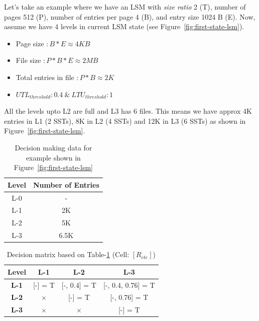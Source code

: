 Let's take an example where we have an LSM with \textit{size ratio} 2 (T), number of pages 512 (P), 
number of entries per page 4 (B), and entry size 1024 B (E). Now, assume we have 4 levels in current LSM state 
(see Figure~\ref{fig:first-state-lsm}).

\begin{itemize}
    \item Page size $\colon B * E \approx 4 KB$
    \item File size $\colon P * B * E \approx 2 MB$
    \item Total entries in file $\colon P * B \approx 2 K$
    \item $UTL_{threshold} \colon 0.4\ \&\ LTU_{threshold} \colon 1$ 
\end{itemize}

All the levels upto L2 are full and L3 has 6 files. This means we have approx 4K entries in L1 (2 SSTs), 8K in 
L2 (4 SSTs) and 12K in L3 (6 SSTs) as shown in Figure~\ref{fig:first-state-lsm}.

\begin{table}
    \begin{tabular}{|c|c|}
        \hline
        \textbf{Level} & \textbf{Number of Entries} \\
        \hline
        L-0 & \-- \\
        \hline
        L-1 & 2K \\
        \hline
        L-2 & 5K \\
        \hline
        L-3 & 6.5K \\
        \hline
    \end{tabular}
    \caption{Decision making data for example shown in Figure~\ref{fig:first-state-lsm}}
    \label{table:ex-decision-making-meta-data}
\end{table}

\begin{table}
    \begin{tabular}{ |c|c|c|c| }
        \hline
        \textbf{Level} & \textbf{L-1} & \hspace*{4.1mm}\textbf{L-2}\hspace*{4.1mm} & \hspace*{4.1mm}\textbf{L-3}\hspace*{4.1mm} \\
        \hline
        \textbf{L-1} & [-] = T & [-, 0.4] = T & [-, 0.4, 0.76] = T \\
        \hline
        \textbf{L-2} & $\times$ & [-] = T & [-, 0.76] = T \\
        \hline
        \textbf{L-3} &  $\times$ &  $\times$ & [-] = T \\
        \hline
    \end{tabular}
    \caption{Decision matrix based on Table-\ref{table:ex-decision-making-meta-data} (Cell: $[R_{ete}]$)}
    \label{table:ex-decision-matrix}
\end{table}

